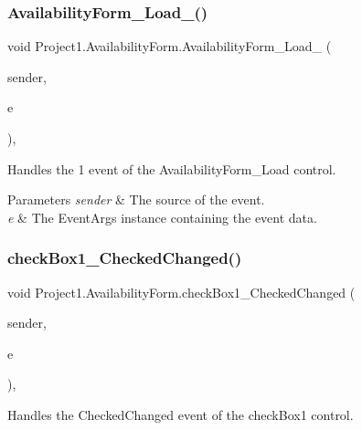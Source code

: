 \subsubsection{\texorpdfstring{Availability\+Form\+\_\+\+Load\+\_()}{AvailabilityForm\_Load\_1()}}
{\footnotesize\ttfamily void Project1.\+Availability\+Form.\+Availability\+Form\+\_\+\+Load\+\_ (\begin{DoxyParamCaption}\item[{object}]{sender,  }\item[{Event\+Args}]{e }\end{DoxyParamCaption})\hspace{0.3cm}{\ttfamily [inline]}, {\ttfamily [private]}}



Handles the 1 event of the Availability\+Form\+\_\+\+Load control. 


\begin{DoxyParams}{Parameters}
{\em sender} & The source of the event.\\
\hline
{\em e} & The Event\+Args instance containing the event data.\\
\hline
\end{DoxyParams}
\mbox{\label{classProject1_1_1AvailabilityForm_ad48d58c06771dc092941ebbeea059895}} 
\subsubsection{\texorpdfstring{check\+Box1\+\_\+\+Checked\+Changed()}{checkBox1\_CheckedChanged()}}
{\footnotesize\ttfamily void Project1.\+Availability\+Form.\+check\+Box1\+\_\+\+Checked\+Changed (\begin{DoxyParamCaption}\item[{object}]{sender,  }\item[{Event\+Args}]{e }\end{DoxyParamCaption})\hspace{0.3cm}{\ttfamily [inline]}, {\ttfamily [private]}}



Handles the Checked\+Changed event of the check\+Box1 control. 


